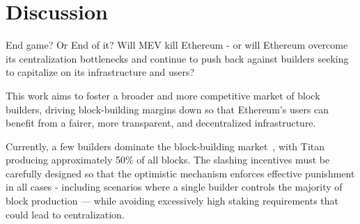 \section{Discussion}
\label{sec:disscusion}

End game? Or End of it?
Will MEV kill Ethereum - or will Ethereum overcome its centralization bottlenecks and continue to push back against builders seeking to capitalize on its infrastructure and users?

This work aims to foster a broader and more competitive market of block builders, driving block-building margins down so that Ethereum’s users can benefit from a fairer, more transparent, and decentralized infrastructure.

Currently, a few builders dominate the block-building market~\cite{relayscan}, with Titan producing approximately 50\% of all blocks.
The slashing incentives must be carefully designed so that the optimistic mechanism enforces effective punishment in all cases - including scenarios where a single builder controls the majority of block production — while avoiding excessively high staking requirements that could lead to centralization.